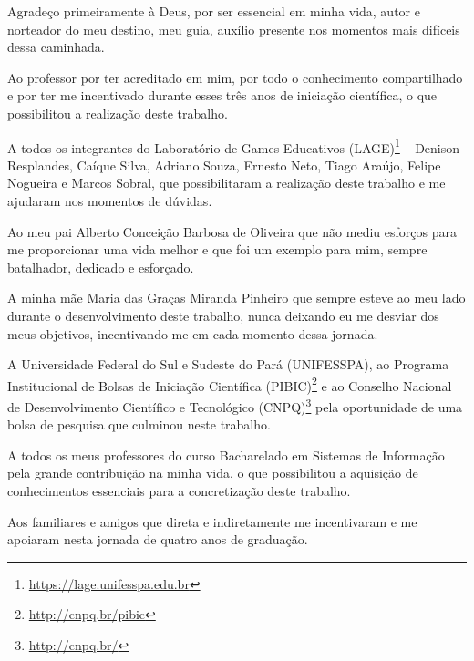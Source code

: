 %
%

\begin{agradecimento}
	
	Agradeço primeiramente à Deus, por ser essencial em minha vida, autor e norteador do meu destino, meu guia, auxílio presente nos momentos mais difíceis dessa caminhada.
	
	Ao professor \imprimirorientador \space por ter acreditado em mim, por todo o conhecimento compartilhado e por ter me incentivado durante esses três anos de iniciação científica, o que possibilitou a realização deste trabalho.
	
	A todos os integrantes do Laboratório de Games Educativos (LAGE)\footnote{\url{https://lage.unifesspa.edu.br}} -- Denison Resplandes, Caíque Silva, Adriano Souza, Ernesto Neto, Tiago Araújo, Felipe Nogueira e Marcos Sobral, que possibilitaram a realização deste trabalho e me ajudaram nos momentos de dúvidas.
	
	Ao meu pai Alberto Conceição Barbosa de Oliveira que não mediu esforços para me proporcionar uma vida melhor e que foi um exemplo para mim, sempre batalhador, dedicado e esforçado.
	
	A minha mãe Maria das Graças Miranda Pinheiro que sempre esteve ao meu lado durante o desenvolvimento deste trabalho, nunca deixando eu me desviar dos meus objetivos, incentivando-me em cada momento dessa jornada.
	
	A Universidade Federal do Sul e Sudeste do Pará (UNIFESSPA), ao Programa Institucional de Bolsas de Iniciação Científica (PIBIC)\footnote{\url{http://cnpq.br/pibic}} e ao Conselho Nacional de Desenvolvimento Científico e Tecnológico (CNPQ)\footnote{\url{http://cnpq.br/}} pela oportunidade de uma bolsa de pesquisa que culminou neste trabalho.
	
	A todos os meus professores do curso Bacharelado em Sistemas de Informação pela grande contribuição na minha vida, o que possibilitou a aquisição de conhecimentos essenciais para a concretização deste trabalho.
	
	Aos familiares e amigos que direta e indiretamente me incentivaram e me apoiaram nesta jornada de quatro anos de graduação.
	
\end{agradecimento}


